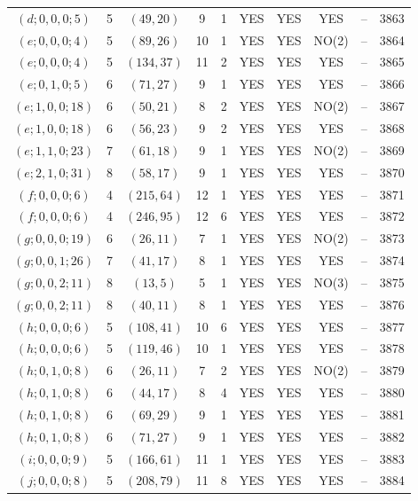 \begin{longtable}{|c|c|c|c|c|c|c|c|c|c|}
$(d; 0, 0, 0; 5)$ & 5 & $(49, 20)$ & 9 & 1 & YES & YES & YES & -- & 3863\\
$(e; 0, 0, 0; 4)$ & 5 & $(89, 26)$ & 10 & 1 & YES & YES & NO(2) & -- & 3864\\
$(e; 0, 0, 0; 4)$ & 5 & $(134, 37)$ & 11 & 2 & YES & YES & YES & -- & 3865\\
$(e; 0, 1, 0; 5)$ & 6 & $(71, 27)$ & 9 & 1 & YES & YES & YES & -- & 3866\\
$(e; 1, 0, 0; 18)$ & 6 & $(50, 21)$ & 8 & 2 & YES & YES & NO(2) & -- & 3867\\
$(e; 1, 0, 0; 18)$ & 6 & $(56, 23)$ & 9 & 2 & YES & YES & YES & -- & 3868\\
$(e; 1, 1, 0; 23)$ & 7 & $(61, 18)$ & 9 & 1 & YES & YES & NO(2) & -- & 3869\\
$(e; 2, 1, 0; 31)$ & 8 & $(58, 17)$ & 9 & 1 & YES & YES & YES & -- & 3870\\
$(f; 0, 0, 0; 6)$ & 4 & $(215, 64)$ & 12 & 1 & YES & YES & YES & -- & 3871\\
$(f; 0, 0, 0; 6)$ & 4 & $(246, 95)$ & 12 & 6 & YES & YES & YES & -- & 3872\\
$(g; 0, 0, 0; 19)$ & 6 & $(26, 11)$ & 7 & 1 & YES & YES & NO(2) & -- & 3873\\
$(g; 0, 0, 1; 26)$ & 7 & $(41, 17)$ & 8 & 1 & YES & YES & YES & -- & 3874\\
$(g; 0, 0, 2; 11)$ & 8 & $(13, 5)$ & 5 & 1 & YES & YES & NO(3) & -- & 3875\\
$(g; 0, 0, 2; 11)$ & 8 & $(40, 11)$ & 8 & 1 & YES & YES & YES & -- & 3876\\
$(h; 0, 0, 0; 6)$ & 5 & $(108, 41)$ & 10 & 6 & YES & YES & YES & -- & 3877\\
$(h; 0, 0, 0; 6)$ & 5 & $(119, 46)$ & 10 & 1 & YES & YES & YES & -- & 3878\\
$(h; 0, 1, 0; 8)$ & 6 & $(26, 11)$ & 7 & 2 & YES & YES & NO(2) & -- & 3879\\
$(h; 0, 1, 0; 8)$ & 6 & $(44, 17)$ & 8 & 4 & YES & YES & YES & -- & 3880\\
$(h; 0, 1, 0; 8)$ & 6 & $(69, 29)$ & 9 & 1 & YES & YES & YES & -- & 3881\\
$(h; 0, 1, 0; 8)$ & 6 & $(71, 27)$ & 9 & 1 & YES & YES & YES & -- & 3882\\
$(i; 0, 0, 0; 9)$ & 5 & $(166, 61)$ & 11 & 1 & YES & YES & YES & -- & 3883\\
$(j; 0, 0, 0; 8)$ & 5 & $(208, 79)$ & 11 & 8 & YES & YES & YES & -- & 3884
\end{longtable}
